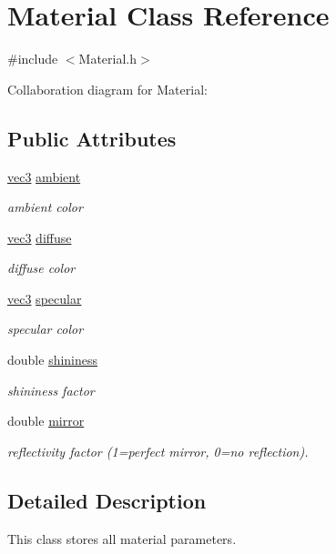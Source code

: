 \hypertarget{structMaterial}{}\section{Material Class Reference}
\label{structMaterial}


{\ttfamily \#include $<$Material.\+h$>$}



Collaboration diagram for Material\+:
\subsection*{Public Attributes}
\begin{DoxyCompactItemize}
\item 
\hyperlink{classvec3}{vec3} \hyperlink{structMaterial_a7b24ee4bc74363181053123fd99e180c}{ambient}
\begin{DoxyCompactList}\small\item\em ambient color \end{DoxyCompactList}\item 
\hyperlink{classvec3}{vec3} \hyperlink{structMaterial_a17ee727d124d7a47afd6038e09fe76dd}{diffuse}
\begin{DoxyCompactList}\small\item\em diffuse color \end{DoxyCompactList}\item 
\hyperlink{classvec3}{vec3} \hyperlink{structMaterial_ab98526482184fa4cab89a33f6c13d033}{specular}
\begin{DoxyCompactList}\small\item\em specular color \end{DoxyCompactList}\item 
double \hyperlink{structMaterial_a3ebd453f91d79ab97ec25632d3ba5959}{shininess}
\begin{DoxyCompactList}\small\item\em shininess factor \end{DoxyCompactList}\item 
double \hyperlink{structMaterial_a0dbe6293086abea5d497ec9000ab9f0a}{mirror}
\begin{DoxyCompactList}\small\item\em reflectivity factor (1=perfect mirror, 0=no reflection). \end{DoxyCompactList}\end{DoxyCompactItemize}


\subsection{Detailed Description}
This class stores all material parameters. 

